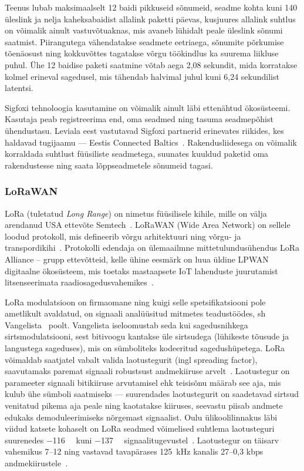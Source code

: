 \documentclass[12pt]{article}
\begin{document}
    Teenus lubab maksimaalselt 12 baidi pikkuseid sõnumeid, seadme kohta kuni 140 üleslink ja nelja kaheksabaidist allalink paketti päevas, kusjuures allalink suhtlus on võimalik ainult vastuvõtuaknas, mis avaneb lühidalt peale üleslink sõnumi saatmist.
    Piirangutega vähendatakse seadmete eetriaega, sõnumite põrkumise tõenäosust ning kokkuvõttes tagatakse võrgu töökindlus ka suurema liikluse puhul.
    Ühe 12 baidise paketi saatmine võtab aega 2,08 sekundit, mida korratakse kolmel erineval sagedusel, mis tähendab halvimal juhul kuni 6,24 sekundilist latentsi.

    Sigfoxi tehnoloogia kasutamine on võimalik ainult läbi ettenähtud ökosüsteemi.
    Kasutaja peab registreerima end, oma seadmed ning tasuma seadmepõhist ühendustasu.
    Leviala eest vastutavad Sigfoxi partnerid erinevates riikides, kes haldavad tugijaamu — Eestis Connected Baltics~\cite{sfCoverage}.
    Rakendusliidesega on võimalik korraldada suhtlust füüsiliste seadmetega, suunates kuuldud paketid oma rakendustesse ning saata lõppseadmetele sõnumeid tagasi.

    \subsubsection{LoRaWAN}

    LoRa (tuletatud \textit{Long Range}) on nimetus füüsilisele kihile, mille on välja arendanud USA ettevõte Semtech~\cite{loraIntro}.
    LoRaWAN (Wide Area Network) on sellele loodud protokoll, mis defineerib võrgu arhitektuuri ning võrgu- ja transpordikihi~\cite{lorawanIntro}.
    Protokolli edendaja on ülemaailmne mittetulundusühendus LoRa Alliance -- grupp ettevõtteid, kelle ühine eesmärk on luua üldine LPWAN digitaalne ökosüsteem, mis toetaks mastaapsete IoT lahenduste juurutamist litsenseerimata raadiosagedusvahemikes~\cite{loraalliance}.

    LoRa modulatsioon on firmaomane ning kuigi selle spetsifikatsiooni pole ametlikult avaldatud, on signaali analüüsitud mitmetes teadustöödes, sh Vangelista~\cite{vangelista} poolt.
    Vangelista iseloomustab seda kui sagedusnihkega sirtsmodulatsiooni, sest bitivoogu kantakse üle sirtsudega (lühikeste tõusude ja langustega sageduses), mis on sümboliteks kodeeritud sagedushüpetega.
    LoRa võimaldab saatjatel vabalt valida laotustegurit (ingl spreading factor), saavutamaks paremat signaali robustsust andmekiiruse arvelt~\cite{loramodulation}.
    Laotustegur on parameeter signaali bitikiiruse arvutamisel ehk teisisõnu määrab see aja, mis kulub ühe sümboli saatmiseks — suurendades laotustegurit on saadetavad sirtsud venitatud pikema aja peale ning kaotatakse kiiruses, seevastu piisab andmete edukaks demoduleerimiseks nõrgemast signaalist.
    Oulu ülikoolilinnakus läbi viidud katsete kohaselt on LoRa seadmed võimelised suhtlema laotusteguri suurenedes \SI{-116}{\deci\belm} kuni \SI{-137}{\deci\belm} signaalitugevustel~\cite{petajajarvi}.
    Laotustegur on täisarv vahemikus 7--12 ning vastavad tavapärases \SI{125}{\kilo\hertz} kanalis 27--0,3 kbps andmekiirustele~\cite{adelanto}.
\end{document}
